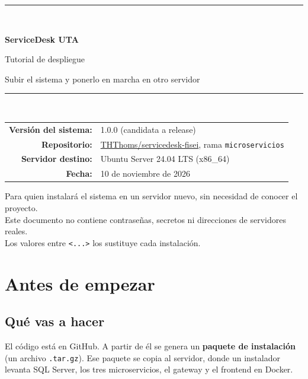 \documentclass[11pt,a4paper,oneside]{report}
\newcommand{\cod}[1]{\texttt{\small #1}}
\begin{document}
\begin{titlepage}
  \centering
  \vspace*{2.5cm}
  {\color{utaRojo}\rule{\linewidth}{1.2pt}}\\[14pt]
  {\Huge\bfseries ServiceDesk UTA\par}
  \vspace{8pt}
  {\LARGE Tutorial de despliegue\par}
  \vspace{4pt}
  {\large Subir el sistema y ponerlo en marcha en otro servidor\par}
  \vspace{6pt}
  {\color{utaRojo}\rule{\linewidth}{1.2pt}}\\[30pt]
  \begin{tabular}{rl}
    \textbf{Versión del sistema:} & 1.0.0 (candidata a release) \\
    \textbf{Repositorio:} & \href{https://github.com/THThoms/servicedesk-fisei/tree/microservicios}{\ttfamily THThoms/servicedesk-fisei}, rama \texttt{microservicios} \\
    \textbf{Servidor destino:} & Ubuntu Server 24.04 LTS (x86\_64) \\
    \textbf{Fecha:} & 10 de noviembre de 2026 \\
  \end{tabular}
  \vfill
  {\small\color{gris}Para quien instalará el sistema en un servidor nuevo, sin necesidad de conocer el proyecto.\\
  Este documento no contiene contraseñas, secretos ni direcciones de servidores reales.\\
  Los valores entre \texttt{<...>} los sustituye cada instalación.\par}
\end{titlepage}

\tableofcontents
\clearpage
{}

\chapter{Antes de empezar}

\section{Qué vas a hacer}
El código está en GitHub. A partir de él se genera un \textbf{paquete de instalación}
(un archivo \cod{.tar.gz}). Ese paquete se copia al servidor, donde un instalador levanta
SQL Server, los tres microservicios, el gateway y el frontend en Docker.
\end{document}
